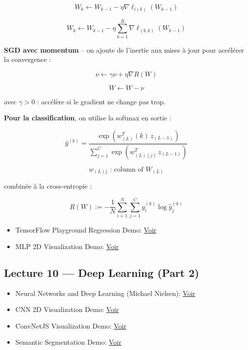 \documentclass[11pt,a4paper,openany]{book}
\begin{document}
\[
W_k \leftarrow W_{k-1} - \eta \nabla \ell_{i(k)}(W_{k-1})
\]

\[
W_k \leftarrow W_{k-1} - \eta \sum_{b=1}^{B} \nabla \ell_{(b,k)}(W_{k-1})
\]

\bigskip

\textbf{SGD avec momentum} -- on ajoute de l'inertie aux mises à jour pour accélérer la convergence :

\[
\nu \leftarrow \gamma \nu + \eta\nabla R(W)
\]

\[
W \leftarrow W - \nu
\]

avec $\gamma > 0$ : accélère si le gradient ne change pas trop.

\medskip

\textbf{Pour la classification}, on utilise la softmax en sortie :

\[
\hat{y}^{(k)} =
\frac{
\exp\left(w_{(L)}^T(k)\, z_{(L-1)}\right)
}{
\sum_{j=1}^{C}
\exp\left(w_{(L)(j)}^T\, z_{(L-1)}\right)
}
\]

\[
w_{(L)j} \text{ : column of } W_{(L)}
\]

combinée à la cross-entropie :

\[
R(W) := - \frac{1}{N}
\sum_{i=1}^{N} \sum_{j=1}^{C}
y_{i}^{(k)} \log \hat{y}^{(k)}_j
\]

\begin{itemize}
    \item TensorFlow Playground Regression Demo:
    \href{https://playground.tensorflow.org/}{Voir}

    \item MLP 2D Visualization Demo:
    \href{https://adamharley.com/nn_vis/mlp/2d.html}{Voir}
\end{itemize}

\subsection{Lecture 10 --- Deep Learning (Part 2)}

\begin{itemize}
    \item Neural Networks and Deep Learning (Michael Nielsen):
    \href{http://neuralnetworksanddeeplearning.com}{Voir}

    \item CNN 2D Visualization Demo:
    \href{https://adamharley.com/nn_vis/cnn/2d.html}{Voir}

    \item ConvNetJS Visualization Demo:
    \href{https://cs.stanford.edu/people/karpathy/convnetjs/}{Voir}

    \item Semantic Segmentation Demo:
    \href{http://deepscene.cs.uni-freiburg.de}{Voir}
\end{itemize}
\end{document}
